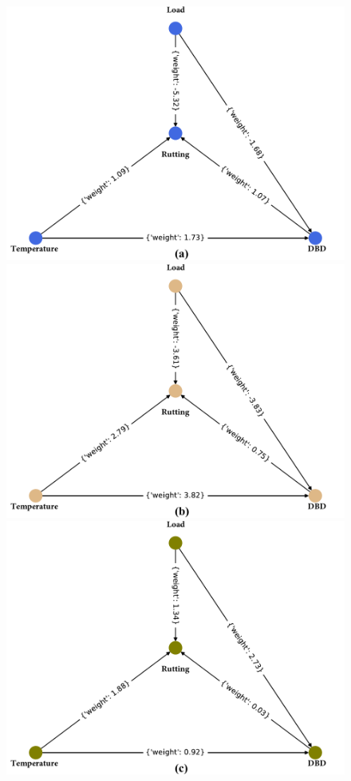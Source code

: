 \begin{figure}[htbp]
\begin{center}
\includegraphics[scale=0.3]{./ch2/fig2_11.pdf}
\includegraphics[scale=0.3]{./ch2/fig2_12.pdf}
\includegraphics[scale=0.3]{./ch2/fig2_13.pdf}\\

\end{center}
\end{figure}
